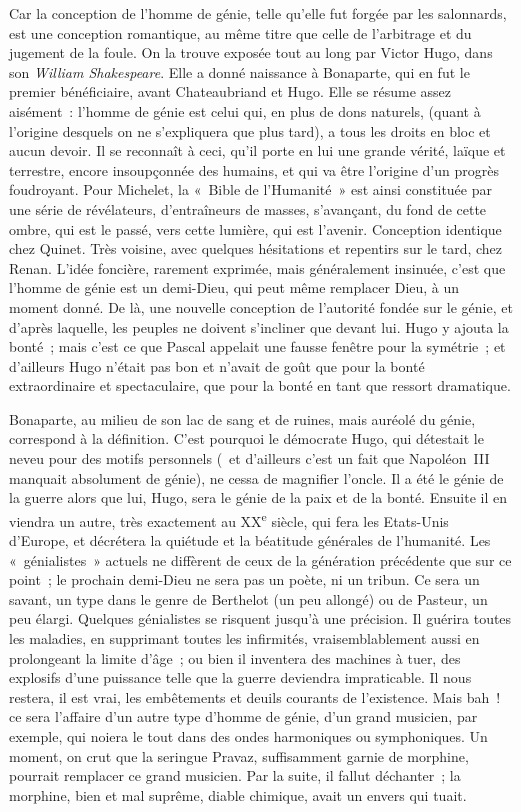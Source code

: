 \documentclass[french,twoside]{book} %
\begin{document}
Car la conception de l’homme de génie, telle qu’elle fut forgée par les salonnards, est une conception romantique, au même titre que celle de l’arbitrage et du jugement de la foule. On la trouve exposée tout au long par Victor Hugo, dans son {\itshape William Shakespeare}. Elle a donné naissance à Bonaparte, qui en fut le premier bénéficiaire, avant Chateaubriand et Hugo. Elle se résume assez aisément : l’homme de génie est celui qui, en plus de dons naturels, (quant à l’origine desquels on ne s’expliquera que plus tard), a tous les droits en bloc et aucun devoir. Il se reconnaît à ceci, qu’il porte en lui une grande vérité, laïque et terrestre, encore insoupçonnée des humains, et qui va être l’origine d’un progrès foudroyant. Pour Michelet, la « Bible de l’Humanité » est ainsi constituée par une série de révélateurs, d’entraîneurs de masses, s’avançant, du fond de cette ombre, qui est le passé, vers cette lumière, qui est l’avenir. Conception identique chez Quinet. Très voisine, avec quelques hésitations et repentirs sur le tard, chez Renan. L’idée foncière, rarement exprimée, mais généralement insinuée, c’est que l’homme de génie est un demi-Dieu, qui peut même remplacer Dieu, à un moment donné. De là, une nouvelle conception de l’autorité fondée sur le génie, et d’après laquelle, les peuples ne doivent s’incliner que devant lui. Hugo y ajouta la bonté ; mais c’est ce que Pascal appelait une fausse fenêtre pour la symétrie ; et d’ailleurs Hugo n’était pas bon et n’avait de goût que pour la bonté extraordinaire et spectaculaire, que pour la bonté en tant que ressort dramatique.\par
Bonaparte, au milieu de son lac de sang et de ruines, mais auréolé du génie, correspond à la définition. C’est pourquoi le démocrate Hugo, qui détestait le neveu pour des motifs personnels ( et d’ailleurs c’est un fait que Napoléon III manquait absolument de génie), ne cessa de magnifier l’oncle. Il a été le génie de la guerre alors que lui, Hugo, sera le génie de la paix et de la bonté. Ensuite il en viendra un autre, très exactement au XX\textsuperscript{e} siècle, qui fera les Etats-Unis d’Europe, et décrétera la quiétude et la béatitude générales de l’humanité. Les « génialistes » actuels ne diffèrent de ceux de la génération précédente que sur ce point ; le prochain demi-Dieu ne sera pas un poète, ni un tribun. Ce sera un savant, un type dans le genre de Berthelot (un peu allongé) ou de Pasteur, un peu élargi. Quelques génialistes se risquent jusqu’à une précision. Il guérira toutes les maladies, en supprimant toutes les infirmités, vraisemblablement aussi en prolongeant la limite d’âge ; ou bien il inventera des machines à tuer, des explosifs d’une puissance telle que la guerre deviendra impraticable. Il nous restera, il est vrai, les embêtements et deuils courants de l’existence. Mais bah ! ce sera l’affaire d’un autre type d’homme de génie, d’un grand musicien, par exemple, qui noiera le tout dans des ondes harmoniques ou symphoniques. Un moment, on crut que la seringue Pravaz, suffisamment garnie de morphine, pourrait remplacer ce grand musicien. Par la suite, il fallut déchanter ; la morphine, bien et mal suprême, diable chimique, avait un envers qui tuait.\par
\end{document}
